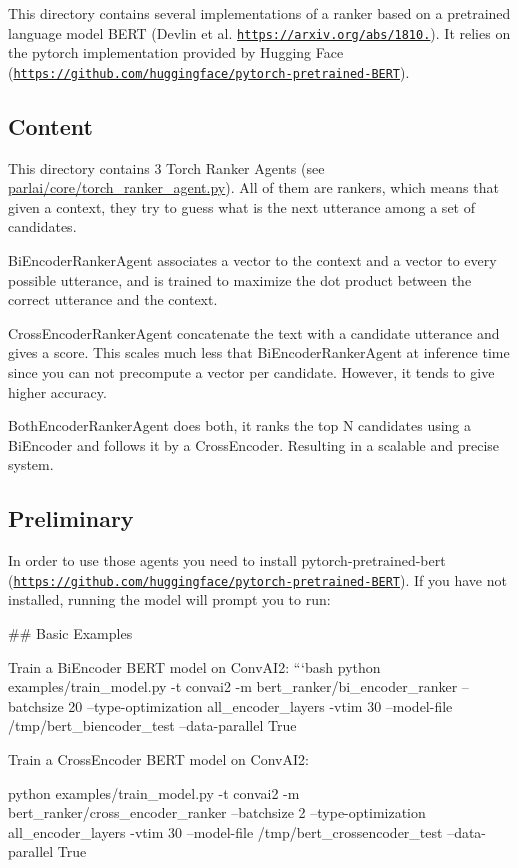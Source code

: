This directory contains several implementations of a ranker based on a pretrained language model B\+E\+RT (Devlin et al. \href{https://arxiv.org/abs/1810.04805}{\tt https\+://arxiv.\+org/abs/1810.}). It relies on the pytorch implementation provided by Hugging Face (\href{https://github.com/huggingface/pytorch-pretrained-BERT}{\tt https\+://github.\+com/huggingface/pytorch-\/pretrained-\/\+B\+E\+RT}).

\subsection*{Content}

This directory contains 3 Torch Ranker Agents (see \hyperlink{torch__ranker__agent_8py}{parlai/core/torch\+\_\+ranker\+\_\+agent.\+py}). All of them are rankers, which means that given a context, they try to guess what is the next utterance among a set of candidates.
\begin{DoxyItemize}
\item Bi\+Encoder\+Ranker\+Agent associates a vector to the context and a vector to every possible utterance, and is trained to maximize the dot product between the correct utterance and the context.
\item Cross\+Encoder\+Ranker\+Agent concatenate the text with a candidate utterance and gives a score. This scales much less that Bi\+Encoder\+Ranker\+Agent at inference time since you can not precompute a vector per candidate. However, it tends to give higher accuracy.
\item Both\+Encoder\+Ranker\+Agent does both, it ranks the top N candidates using a Bi\+Encoder and follows it by a Cross\+Encoder. Resulting in a scalable and precise system.
\end{DoxyItemize}

\subsection*{Preliminary}

In order to use those agents you need to install pytorch-\/pretrained-\/bert (\href{https://github.com/huggingface/pytorch-pretrained-BERT}{\tt https\+://github.\+com/huggingface/pytorch-\/pretrained-\/\+B\+E\+RT}). If you have not installed, running the model will prompt you to run\+: 
\begin{DoxyCode}
## Basic Examples

Train a BiEncoder BERT model on ConvAI2:
```bash
python examples/train\_model.py -t convai2 -m bert\_ranker/bi\_encoder\_ranker --batchsize 20
       --type-optimization all\_encoder\_layers -vtim 30 --model-file /tmp/bert\_biencoder\_test --data-parallel True
\end{DoxyCode}


Train a Cross\+Encoder B\+E\+RT model on Conv\+A\+I2\+: 
\begin{DoxyCode}
python examples/train\_model.py -t convai2 -m bert\_ranker/cross\_encoder\_ranker --batchsize 2
       --type-optimization all\_encoder\_layers -vtim 30 --model-file /tmp/bert\_crossencoder\_test --data-parallel True
\end{DoxyCode}
 